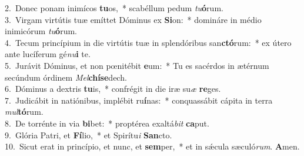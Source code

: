 {2.~}Donec ponam inimícos \textbf{tu}os,~* scabéllum pedum \textit{tu}\textbf{ó}rum.\\
{3.~}Virgam virtútis tuæ emíttet Dóminus ex \textbf{Si}on:~* domináre in médio inimicórum \textit{tu}\textbf{ó}rum.\\
{4.~}Tecum princípium in die virtútis tuæ in splendóribus san\textbf{ctó}rum:~* ex útero ante lucíferum gé\textit{nu}\textbf{i} te.\\
{5.~}Jurávit Dóminus, et non pœnitébit \textbf{e}um:~* Tu es sacérdos in ætérnum secúndum órdinem \textit{Mel}\textbf{chí}\textbf{se}dech.\\
{6.~}Dóminus a dextris \textbf{tu}is,~* confrégit in die iræ su\textit{æ} \textbf{re}ges.\\
{7.~}Judicábit in natiónibus, implébit ru\textbf{í}nas:~* conquassábit cápita in terra \textit{mul}\textbf{tó}rum.\\
{8.~}De torrénte in via \textbf{bi}bet:~* proptérea exaltá\textit{bit} \textbf{ca}put.\\
{9.~}Glória Patri, et \textbf{Fí}lio,~* et Spirítu\textit{i} \textbf{San}cto.\\
{10.~}Sicut erat in princípio, et nunc, et \textbf{sem}per,~* et in sǽcula sæculó\textit{rum}. \textbf{A}men.\\
